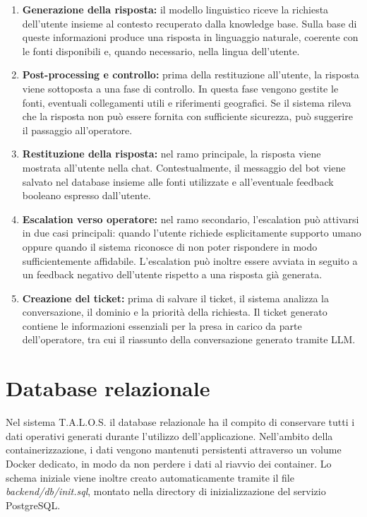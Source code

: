 \begin{enumerate}
\item \textbf{Generazione della risposta:} il modello linguistico riceve la richiesta dell’utente insieme al contesto recuperato dalla knowledge base. Sulla base di queste informazioni produce una risposta in linguaggio naturale, coerente con le fonti disponibili e, quando necessario, nella lingua dell’utente.

\item \textbf{Post-processing e controllo:} prima della restituzione all’utente, la risposta viene sottoposta a una fase di controllo. In questa fase vengono gestite le fonti, eventuali collegamenti utili e riferimenti geografici. Se il sistema rileva che la risposta non può essere fornita con sufficiente sicurezza, può suggerire il passaggio all’operatore.

\item \textbf{Restituzione della risposta:} nel ramo principale, la risposta viene mostrata all’utente nella chat. Contestualmente, il messaggio del bot viene salvato nel database insieme alle fonti utilizzate e all’eventuale feedback booleano espresso dall’utente.

\item \textbf{Escalation verso operatore:} nel ramo secondario, l’escalation può attivarsi in due casi principali: quando l’utente richiede esplicitamente supporto umano oppure quando il sistema riconosce di non poter rispondere in modo sufficientemente affidabile. L’escalation può inoltre essere avviata in seguito a un feedback negativo dell’utente rispetto a una risposta già generata.

\item \textbf{Creazione del ticket:} prima di salvare il ticket, il sistema analizza la conversazione, il dominio e la priorità della richiesta. Il ticket generato contiene le informazioni essenziali per la presa in carico da parte dell’operatore, tra cui il riassunto della conversazione generato tramite LLM.

\end{enumerate}

\section{Database relazionale}

Nel sistema T.A.L.O.S. il database relazionale ha il compito di conservare tutti i dati operativi generati durante l’utilizzo dell’applicazione. Nell'ambito della containerizzazione, i dati vengono mantenuti persistenti attraverso un volume Docker dedicato, in modo da non perdere i dati al riavvio dei container. Lo schema iniziale viene inoltre creato automaticamente tramite il file \textit{backend/db/init.sql}, montato nella directory di inizializzazione del servizio PostgreSQL.

